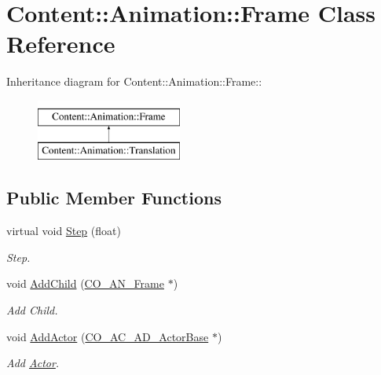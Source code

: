 \hypertarget{classContent_1_1Animation_1_1Frame}{
\section{Content::Animation::Frame Class Reference}
\label{classContent_1_1Animation_1_1Frame}
}
Inheritance diagram for Content::Animation::Frame::\begin{figure}[H]
\begin{center}
\leavevmode
\includegraphics[height=2cm]{classContent_1_1Animation_1_1Frame}
\end{center}
\end{figure}
\subsection*{Public Member Functions}
\begin{DoxyCompactItemize}
\item 
\hypertarget{classContent_1_1Animation_1_1Frame_a855ee1cc0c276df746f16d569a321761}{
virtual void \hyperlink{classContent_1_1Animation_1_1Frame_a855ee1cc0c276df746f16d569a321761}{Step} (float)}
\label{classContent_1_1Animation_1_1Frame_a855ee1cc0c276df746f16d569a321761}

\begin{DoxyCompactList}\small\item\em Step. \item\end{DoxyCompactList}\item 
\hypertarget{classContent_1_1Animation_1_1Frame_a948f2485bb5313c6004143774125c287}{
void \hyperlink{classContent_1_1Animation_1_1Frame_a948f2485bb5313c6004143774125c287}{AddChild} (\hyperlink{classContent_1_1Animation_1_1Frame}{CO\_\-AN\_\-Frame} $\ast$)}
\label{classContent_1_1Animation_1_1Frame_a948f2485bb5313c6004143774125c287}

\begin{DoxyCompactList}\small\item\em Add Child. \item\end{DoxyCompactList}\item 
\hypertarget{classContent_1_1Animation_1_1Frame_ab9b07ec14798cb811748d54ffdd494d3}{
void \hyperlink{classContent_1_1Animation_1_1Frame_ab9b07ec14798cb811748d54ffdd494d3}{AddActor} (\hyperlink{classContent_1_1Actor_1_1Admin_1_1ActorBase}{CO\_\-AC\_\-AD\_\-ActorBase} $\ast$)}
\label{classContent_1_1Animation_1_1Frame_ab9b07ec14798cb811748d54ffdd494d3}

\begin{DoxyCompactList}\small\item\em Add \hyperlink{namespaceContent_1_1Actor}{Actor}. \item\end{DoxyCompactList}\end{DoxyCompactItemize}
